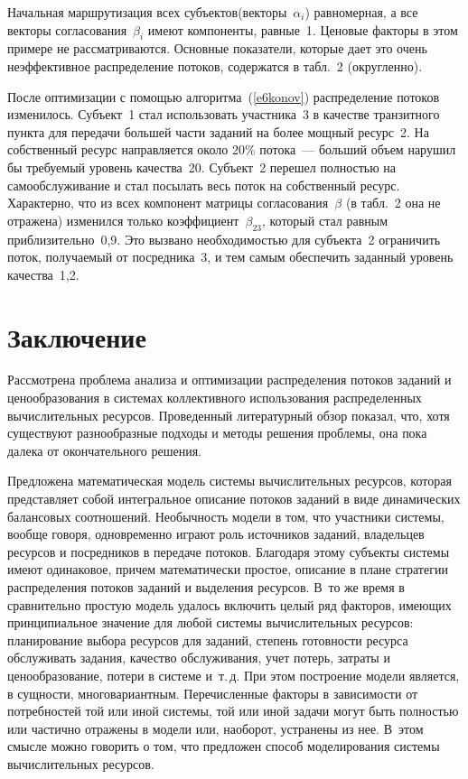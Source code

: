 \begin{multicols}{2}
  Начальная маршрутизация всех субъектов\linebreak (векторы~$\alpha_i$) равномерная, а все 
векторы согласования~$\beta_i$ имеют компоненты, равные~1. Ценовые факто\-ры в этом 
примере не рассматриваются. Основные показатели, которые дает это очень неэффективное 
распределение потоков, содержатся в табл.~2 (округленно).
  

  После оптимизации с помощью алгоритма~(\ref{e6konov}) распределение потоков 
изменилось. Субъект~1 стал использовать участника~3 в качестве транзитного пункта для 
передачи большей части заданий на более мощный ресурс~2. На собственный ресурс 
направляется около 20\% потока~--- больший объем нарушил бы требуемый уровень 
качества~20. Субъект~2 перешел полностью на самообслуживание и стал посылать весь 
поток на собственный ресурс. Характерно, что из всех компонент матрицы 
согласования~$\beta$ (в табл.~2 она не отражена) изменился только 
коэффициент~$\beta_{23}$, который стал равным приблизительно~0,9. Это вызвано 
необходимостью для субъекта~2 ограничить поток, получаемый от посредника~3, и тем 
самым обеспечить заданный уровень качества~1,2.

\section{Заключение}
  
  Рассмотрена проблема анализа и оптимизации распределения потоков заданий и 
ценообразования в системах коллективного использования распределенных вычислительных 
ресурсов. Проведенный литературный обзор показал, что, хотя существуют разнообразные 
подходы и методы решения проблемы, она пока далека от окончательного решения.
  
  Предложена математическая модель системы вычислительных ресурсов, которая 
представляет собой интегральное описание потоков заданий в виде динамических 
балансовых соотношений. Необычность модели в том, что участники системы, вообще 
говоря, одновременно играют роль источников заданий, владельцев ресурсов и посредников 
в передаче потоков. Благодаря этому субъекты сис\-те\-мы имеют одинаковое, причем 
математически простое, описание в плане стратегии распределения потоков заданий и 
выделения ресурсов. В~то же время в сравнительно простую модель удалось включить 
целый ряд факторов, имеющих принципиальное значение для любой системы 
вычислительных ресурсов: планирование выбора ресурсов для заданий, степень готовности 
ресурса обслуживать задания, качество обслуживания, учет потерь, затраты и 
ценообразование, потери в системе и~т.\,д. При этом построение модели является, в 
сущ\-ности, многовариантным. Перечисленные факторы в зависимости от потребностей той 
или иной сис\-те\-мы, той или иной задачи могут быть полностью или частично отражены в 
модели или, наоборот, устранены из нее. В~этом смысле можно говорить о том, что 
предложен способ моделирования системы вычислительных ресурсов.
  

\end{multicols}
